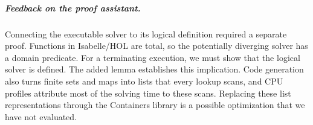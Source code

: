 \subparagraph*{Feedback on the proof assistant.}
Connecting the executable solver to its logical definition required a
separate proof. Functions in Isabelle/HOL are total, so the potentially
diverging solver has a domain predicate. For a terminating execution, we must
show that the logical solver is defined. The added lemma
 establishes this implication.
Code generation also turns finite sets and maps into lists that every
lookup scans, and CPU profiles attribute most of the solving time to these scans.
Replacing these list representations through the Containers library is a
possible optimization that we have not evaluated.
